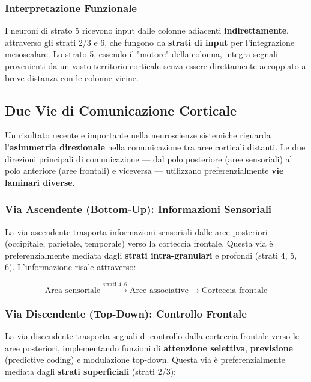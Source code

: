 \subsubsection{Interpretazione Funzionale}

I neuroni di strato 5 ricevono input dalle colonne adiacenti \textbf{indirettamente}, attraverso gli strati 2/3 e 6, che fungono da \textbf{strati di input} per l'integrazione mesoscalare. Lo strato 5, essendo il "motore" della colonna, integra segnali provenienti da un vasto territorio corticale senza essere direttamente accoppiato a breve distanza con le colonne vicine.

\subsection{Due Vie di Comunicazione Corticale}

Un risultato recente e importante nella neuroscienze sistemiche riguarda l'\textbf{asimmetria direzionale} nella comunicazione tra aree corticali distanti. Le due direzioni principali di comunicazione — dal polo posteriore (aree sensoriali) al polo anteriore (aree frontali) e viceversa — utilizzano preferenzialmente \textbf{vie laminari diverse}.

\subsubsection{Via Ascendente (Bottom-Up): Informazioni Sensoriali}

La via ascendente trasporta informazioni sensoriali dalle aree posteriori (occipitale, parietale, temporale) verso la corteccia frontale. Questa via è preferenzialmente mediata dagli \textbf{strati intra-granulari} e profondi (strati 4, 5, 6). L'informazione risale attraverso:

\begin{equation}
\text{Area sensoriale} \xrightarrow{\text{strati 4–6}} \text{Aree associative} \xrightarrow{} \text{Corteccia frontale}
\end{equation}

\subsubsection{Via Discendente (Top-Down): Controllo Frontale}

La via discendente trasporta segnali di controllo dalla corteccia frontale verso le aree posteriori, implementando funzioni di \textbf{attenzione selettiva}, \textbf{previsione} (predictive coding) e modulazione top-down. Questa via è preferenzialmente mediata dagli \textbf{strati superficiali} (strati 2/3):

